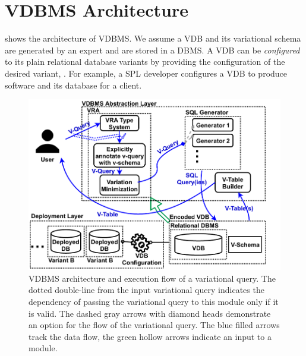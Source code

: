 \section{VDBMS Architecture}
\label{sec:arch}

 shows the architecture of VDBMS.
We assume a VDB and its variational schema are generated by an 
expert and are stored in a DBMS.
A VDB can be \emph{configured} to its plain relational 
database variants
by providing the configuration
of the desired variant, .
For example, a SPL developer configures a VDB to produce 
software and its database for a client.


\begin{figure}
\includegraphics[width = \linewidth] {figs/arch8.pdf}
\caption{VDBMS architecture and execution flow of a variational query. 
The dotted double-line from the input variational query
indicates the dependency of passing the variational query to this module
only if it is valid. 
The dashed gray arrows with diamond heads demonstrate
an option for the flow of the variational query. 
The blue filled arrows track the data flow, the green hollow arrows 
indicate an input to a module.}
\label{fig:arch}
\end{figure}


